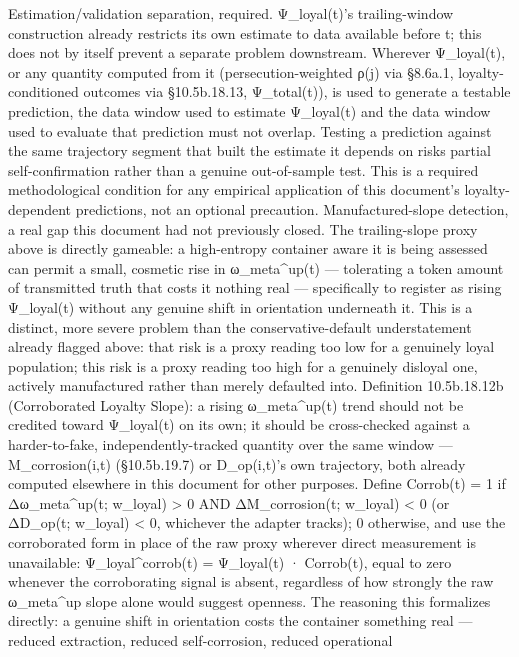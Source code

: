 \documentclass[
]{article}
\begin{document}
Estimation/validation separation, required. Ψ\_loyal(t)'s
trailing-window construction already restricts its own estimate to data
available before t; this does not by itself prevent a separate problem
downstream. Wherever Ψ\_loyal(t), or any quantity computed from it
(persecution-weighted ρ(j) via §8.6a.1, loyalty-conditioned outcomes via
§10.5b.18.13, Ψ\_total(t)), is used to generate a testable prediction,
the data window used to estimate Ψ\_loyal(t) and the data window used to
evaluate that prediction must not overlap. Testing a prediction against
the same trajectory segment that built the estimate it depends on risks
partial self-confirmation rather than a genuine out-of-sample test. This
is a required methodological condition for any empirical application of
this document's loyalty-dependent predictions, not an optional
precaution. Manufactured-slope detection, a real gap this document had
not previously closed. The trailing-slope proxy above is directly
gameable: a high-entropy container aware it is being assessed can permit
a small, cosmetic rise in ω\_meta\^{}up(t) --- tolerating a token amount
of transmitted truth that costs it nothing real --- specifically to
register as rising Ψ\_loyal(t) without any genuine shift in orientation
underneath it. This is a distinct, more severe problem than the
conservative-default understatement already flagged above: that risk is
a proxy reading too low for a genuinely loyal population; this risk is a
proxy reading too high for a genuinely disloyal one, actively
manufactured rather than merely defaulted into. Definition 10.5b.18.12b
(Corroborated Loyalty Slope): a rising ω\_meta\^{}up(t) trend should not
be credited toward Ψ\_loyal(t) on its own; it should be cross-checked
against a harder-to-fake, independently-tracked quantity over the same
window --- M\_corrosion(i,t) (§10.5b.19.7) or D\_op(i,t)'s own
trajectory, both already computed elsewhere in this document for other
purposes. Define Corrob(t) = 1 if Δω\_meta\^{}up(t; w\_loyal)
\textgreater{} 0 AND ΔM\_corrosion(t; w\_loyal) \textless{} 0 (or
ΔD\_op(t; w\_loyal) \textless{} 0, whichever the adapter tracks); 0
otherwise, and use the corroborated form in place of the raw proxy
wherever direct measurement is unavailable: Ψ\_loyal\^{}corrob(t) =
Ψ\_loyal(t) · Corrob(t), equal to zero whenever the corroborating signal
is absent, regardless of how strongly the raw ω\_meta\^{}up slope alone
would suggest openness. The reasoning this formalizes directly: a
genuine shift in orientation costs the container something real ---
reduced extraction, reduced self-corrosion, reduced operational
\end{document}
